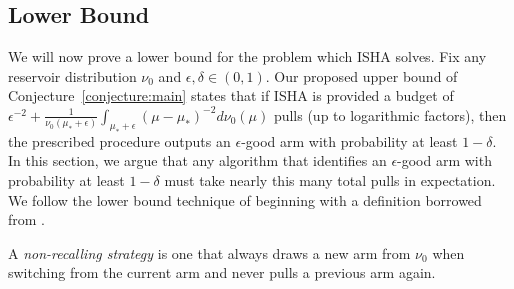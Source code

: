 

\subsection{Lower Bound}

We will now prove a lower bound for the problem which ISHA solves.
Fix any reservoir distribution $\nu_0$ and $\epsilon,\delta \in (0,1)$. 
Our proposed upper bound of Conjecture~\ref{conjecture:main} states that if ISHA is provided a budget of $\epsilon^{-2} + \frac{1}{\nu_0(\mu_* + \epsilon)}\int_{\mu_*+\epsilon} (\mu-\mu_*)^{-2} d\nu_0(\mu)$ pulls (up to logarithmic factors), then the prescribed procedure outputs an $\epsilon$-good arm with probability at least $1-\delta$.
In this section, we argue that any algorithm that identifies an $\epsilon$-good arm with probability at least $1-\delta$ must take nearly this many total pulls in expectation.
We follow the lower bound technique of \cite{malloy2012quickest} beginning with a definition borrowed from \cite{berry1997}.
\begin{definition}
A \emph{non-recalling strategy} is one that always draws a new arm from $\nu_0$ when switching from the current arm and never pulls a previous arm again.
\end{definition}

